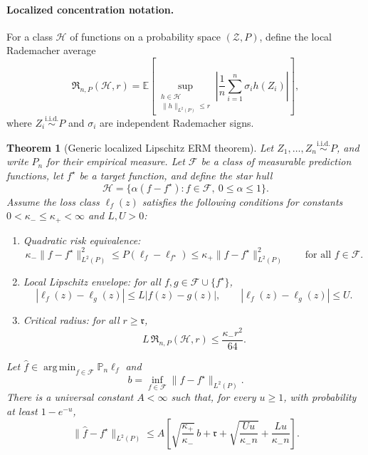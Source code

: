 \documentclass{article}
\newcommand{\sZ}{\mathcal{Z}}
\newcommand{\sF}{\mathcal{F}}
\newcommand{\sH}{\mathcal{H}}
\newcommand{\E}{\mathbb{E}}
\newcommand{\1}{\mathbf{1}}
\newcommand{\Emp}{\mathbb{P}}
\newcommand{\Rad}{\mathfrak{R}}
\newcommand{\crit}{\mathfrak{r}}
\DeclareMathOperator*{\argmin}{arg\,min}
\theoremstyle{plain}
\newtheorem{theorem}{Theorem}[section]
\theoremstyle{definition}
\theoremstyle{remark}
\begin{document}
\paragraph{Localized concentration notation.}
For a class $\sH$ of functions on a probability space $(\sZ,P)$, define the local Rademacher average
\[
    \Rad_{n,P}(\sH,r)
    =
    \E\left[
        \sup_{\substack{h\in\sH\\ \|h\|_{L^2(P)}\le r}}
        \left|
            \frac{1}{n}\sum_{i=1}^n\sigma_i h(Z_i)
        \right|
    \right],
\]
where $Z_i\stackrel{\mathrm{i.i.d.}}{\sim}P$ and $\sigma_i$ are independent Rademacher signs.

\begin{theorem}[Generic localized Lipschitz ERM theorem]
\label{thm:generic-local-erm}
Let $Z_1,\ldots,Z_n\stackrel{\mathrm{i.i.d.}}{\sim}P$, and write $P_n$ for their empirical measure.
Let $\sF$ be a class of measurable prediction functions, let $f^\star$ be a target function, and define the star hull
\[
    \sH
    =
    \{\alpha(f-f^\star):f\in\sF,\ 0\le\alpha\le1\}.
\]
Assume the loss class $\ell_f(z)$ satisfies the following conditions for constants $0<\kappa_-\le\kappa_+<\infty$ and $L,U>0$:
\begin{enumerate}
\item[(i)] Quadratic risk equivalence:
\[
    \kappa_-\|f-f^\star\|_{L^2(P)}^2
    \le
    P(\ell_f-\ell_{f^\star})
    \le
    \kappa_+\|f-f^\star\|_{L^2(P)}^2
    \qquad\text{for all }f\in\sF.
\]
\item[(ii)] Local Lipschitz envelope:
for all $f,g\in\sF\cup\{f^\star\}$,
\[
    |\ell_f(z)-\ell_g(z)|
    \le
    L|f(z)-g(z)|,
    \qquad
    |\ell_f(z)-\ell_g(z)|\le U .
\]
\item[(iii)] Critical radius:
for all $r\ge\crit$,
\[
    L\,\Rad_{n,P}(\sH,r)
    \le
    \frac{\kappa_- r^2}{64}.
\]
\end{enumerate}
Let $\widehat f\in\argmin_{f\in\sF}\Emp_n\ell_f$ and
\[
    b=\inf_{f\in\sF}\|f-f^\star\|_{L^2(P)}.
\]
There is a universal constant $A<\infty$ such that, for every $u\ge1$, with probability at least $1-e^{-u}$,
\[
    \|\widehat f-f^\star\|_{L^2(P)}
    \le
    A\left[
        \sqrt{\frac{\kappa_+}{\kappa_-}}\,b+\crit
        +\sqrt{\frac{Uu}{\kappa_- n}}
        +\frac{Lu}{\kappa_- n}
    \right].
\]
\end{theorem}
\end{document}
